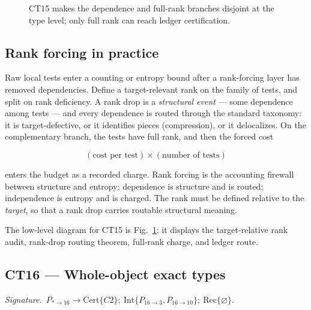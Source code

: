 \documentclass[
  11pt,
]{article}
\theoremstyle{definition}
\newcommand{\ctsignature}[1]{\par\noindent\emph{Signature.}\ #1\par\medskip}
\newcommand{\ctcert}[1]{\mathrm{Cert}\{#1\}}
\newcommand{\ctint}[1]{\mathrm{Int}\{#1\}}
\newcommand{\ctrec}[1]{\mathrm{Rec}\{#1\}}
\newcommand{\ctnone}{\varnothing}
\begin{document}
\begin{figure}[p]
{%
}
\caption[Closure-tactic 15: exact rank-forcing machine]{CT15 makes the dependence and full-rank branches disjoint at the type level; only full rank can reach ledger certification.}
\label{fig:ct15-rank-forcing}
\end{figure}
\FloatBarrier


\subsection*{Rank forcing in practice}

Raw local tests enter a counting or entropy bound after a rank-forcing
layer has removed dependencies. Define a target-relevant rank on the
family of tests, and split on rank deficiency. A rank drop is a
\emph{structural event} --- some dependence among tests --- and every
dependence is routed through the standard taxonomy: it is
target-defective, or it identifies pieces (compression), or it
delocalizes. On the complementary branch, the tests have full rank, and
then the forced cost

\[
(\text{cost per test}) \times (\text{number of tests})
\]

enters the budget as a recorded charge. Rank forcing is the accounting
firewall between structure and entropy: dependence is structure and is
routed; independence is entropy and is charged. The rank must be defined
relative to the \emph{target}, so that a rank drop carries routable
structural meaning.

The low-level diagram for CT15 is Fig.~\ref{fig:ct15-rank-forcing};
it displays the target-relative rank audit, rank-drop routing theorem,
full-rank charge, and ledger route.



\subsection{CT16 --- Whole-object exact types}\label{ct:16}\label{the-whole-object-piece-exact-types-under-context-degeneracy}
\ctsignature{\(P_{\ast\to16}\to \ctcert{C2};\ \ctint{P_{16\to3},P_{16\to10}};\ \ctrec{\ctnone}.\)}
\end{document}
